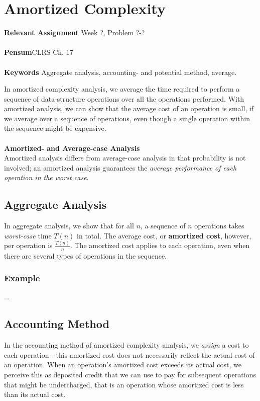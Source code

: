 
\chapter{Amortized Complexity}
\label{ch:amortizedcomplexity}

\textbf{Relevant Assignment} Week ?, Problem ?-?\\\\
\textbf{Pensum}CLRS Ch. 17\\\\
\textbf{Keywords} Aggregate analysis, accounting- and potential method, average.
\vspace{1in}

\noindent In amortized complexity analysis, we average the time required to
perform a sequence of data-structure operations over all the operations
performed. With amortized analysis, we can show that the average cost of an
operation is small, if we average over a sequence of operations, even though
a single operation within the sequence might be expensive.
\\\\
\noindent \textbf{Amortized- and Average-case Analysis} \\
Amortized analysis differs from average-case analysis in that probability is
not involved; an amortized analysis guarantees the \textit{average performance
of each operation in the worst case}.

\newpage
\section{Aggregate Analysis}
In aggregate analysis, we show that for all $n$, a sequence of $n$ operations
takes \textit{worst-case} time $T(n)$ in total. The average cost, or \textbf{
amortized cost}, however, per operation is $\frac{T(n)}{n}$. The amortized
cost applies to each operation, even when there are several types of
operations in the sequence.

\subsection{Example}
...

\section{Accounting Method}
In the accounting method of amortized complexity analysis, we \textit{assign}
a cost to each operation - this amortized cost does not necessarily reflect
the actual cost of an operation. When an operation's amortized cost exceeds
its actual cost, we perceive this as deposited credit that we can use to pay
for subsequent operations that might be undercharged, that is an operation
whose amortized cost is less than its actual cost.

